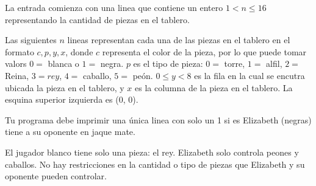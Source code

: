 \documentclass{oci}
\begin{document}
\begin{inputDescription}
    La entrada comienza con una linea que contiene un entero $ 1 < n
    \leq 16$ representando la cantidad de piezas en el tablero.

    Las siguientes $n$ lineas representan cada una de las piezas en el
    tablero en el formato $c, p, y, x$, donde $c$ representa el color
    de la pieza, por lo que puede tomar valors $0 = $ blanca o $1
    = $ negra. $p$ es el tipo de pieza: $0 =$ torre, $1 = $ alfil, $2
    = $ Reina, $3 = rey$, $4 = $ caballo, $5 = $ peón. $0 \leq y < 8$ es la fila en
    la cual se encutra ubicada la pieza en el tablero, y $x$ es la
    columna de la pieza en el tablero. La esquina superior izquierda
    es (0, 0).
\end{inputDescription}

\begin{outputDescription}
    Tu programa debe imprimir una única linea con solo un 1 si es
    Elizabeth (negras) tiene a su oponente en jaque mate.
\end{outputDescription}

\begin{scoreDescription}
  El jugador blanco tiene solo una pieza: el rey.
  Elizabeth solo controla peones y caballos.
  No hay restricciones en la cantidad o tipo de piezas que Elizabeth y
  su oponente pueden controlar.
\end{scoreDescription}

\begin{sampleDescription}
\end{sampleDescription}
\end{document}
